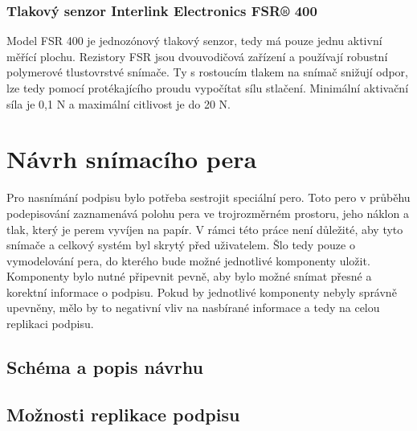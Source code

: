 \subsection*{Tlakový senzor Interlink Electronics FSR® 400}
Model FSR 400 je jednozónový tlakový senzor, tedy má pouze jednu aktivní měřící plochu.                       %
Rezistory FSR jsou dvouvodičová zařízení a používají robustní polymerové tlustovrstvé snímače.                %
Ty s rostoucím tlakem na snímač snižují odpor, lze tedy pomocí protékajícího proudu vypočítat sílu stlačení.  %
Minimální aktivační síla je 0,1 N a maximální citlivost je do 20 N.                                           %


\chapter{Návrh snímacího pera}
Pro nasnímání podpisu bylo potřeba sestrojit speciální pero.                                        %
Toto pero v průběhu podepisování zaznamenává polohu pera ve trojrozměrném prostoru,                 %
jeho náklon a tlak, který je perem vyvíjen na papír.                                                %
V rámci této práce není důležité, aby tyto snímače a celkový systém byl skrytý před uživatelem.     %
Šlo tedy pouze o vymodelování pera, do kterého bude možné jednotlivé komponenty uložit.             %
Komponenty bylo nutné připevnit pevně, aby bylo možné snímat přesné a korektní informace o podpisu. %
Pokud by jednotlivé komponenty nebyly správně upevněny,                                             %
mělo by to negativní vliv na nasbírané informace a tedy na celou replikaci podpisu.                 %
 
\section{Schéma a popis návrhu}



\section{Možnosti replikace podpisu}


